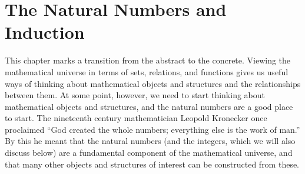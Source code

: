 \documentclass[letterpaper,10pt,english]{sphinxmanual}
\begin{document}
\begin{enumerate}
\begin{sphinxVerbatim}[commandchars=\\\{\}]
                    
  

               
 


                
 
         
         
\end{sphinxVerbatim}

\end{enumerate}


\chapter{The Natural Numbers and Induction}
\label{\detokenize{the_natural_numbers_and_induction:the-natural-numbers-and-induction}}\label{\detokenize{the_natural_numbers_and_induction:id1}}\label{\detokenize{the_natural_numbers_and_induction::doc}}
\sphinxAtStartPar
This chapter marks a transition from the abstract to the concrete. Viewing the mathematical universe in terms of sets, relations, and functions gives us useful ways of thinking about mathematical objects and structures and the relationships between them. At some point, however, we need to start thinking about  mathematical objects and structures, and the natural numbers are a good place to start. The nineteenth century mathematician Leopold Kronecker once proclaimed “God created the whole numbers; everything else is the work of man.” By this he meant that the natural numbers (and the integers, which we will also discuss below) are a fundamental component of the mathematical universe, and that many other objects and structures of interest can be constructed from these.
\end{document}
